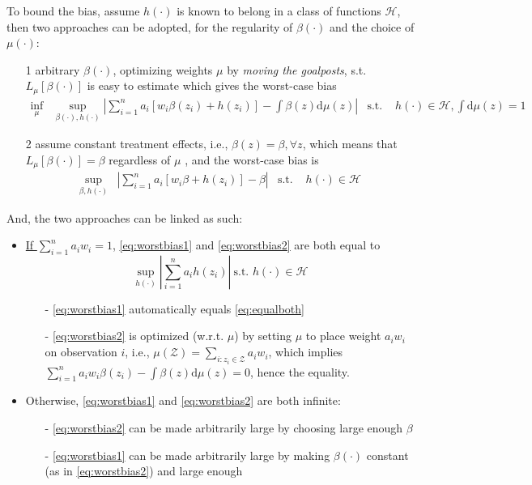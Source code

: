 \documentclass[twoside]{article}
\theoremstyle{definition}
\begin{document}
To bound the bias, assume $h(\cdot)$ is known to belong in a class of functions $\mathcal{H}$, then two approaches can be adopted, for the regularity of $\beta(\cdot)$ and the choice of $\mu(\cdot)$:
\begin{itemize}
  \item[1] arbitrary $\beta(\cdot)$, optimizing weights $\mu$ by \textit{moving the goalposts}, s.t. $L_{\mu}\left[\beta(\cdot)\right]$ is easy to estimate \citep{crump2006moving,imbens2019optimized}
  which gives the worst-case bias
  \begin{align}\label{eq:worstbias1}
    \inf_{\mu} &\sup_{\beta(\cdot),h(\cdot)}\left\vert \sum^n_{i=1}a_i\left[w_i\beta(z_i)+h(z_i)\right] - \int\beta(z)\mathrm{d}\mu(z) \right\vert &\text{s.t. } & h(\cdot)\in\mathcal{H},\int \mathrm{d}\mu(z)=1
  \end{align}
  \item[2] assume constant treatment effects, i.e., $\beta(z)=\beta,\forall z$, which means that $L_{\mu}\left[\beta(\cdot)\right]=\beta$ regardless of $\mu$ \citep{armstrong2020bias}, and the worst-case bias is 
  \begin{align}\label{eq:worstbias2}
    \sup_{\beta,h(\cdot)}&\left\vert \sum^n_{i=1}a_i\left[w_i\beta + h(z_i)\right] -\beta \right\vert & \text{s.t. } & h(\cdot)\in\mathcal{H}
  \end{align}
\end{itemize}

And, the two approaches can be linked as such:
\begin{itemize}
  \item \underline{If $\sum^n_{i=1}a_iw_i=1$}, \ref{eq:worstbias1} and \ref{eq:worstbias2} are both equal to
  \begin{equation}\label{eq:equalboth}
    \sup_{h(\cdot)}\left\vert \sum^n_{i=1}a_ih(z_i) \right\vert\ \text{s.t. } h(\cdot)\in\mathcal{H}
  \end{equation}
  \begin{itemize}
    \item[-] \ref{eq:worstbias1} automatically equals \ref{eq:equalboth}
    \item[-] \ref{eq:worstbias2} is optimized (w.r.t. $\mu$) by setting $\mu$ to place weight $a_iw_i$ on observation $i$, i.e., $\mu(\mathcal{Z})=\sum_{i:z_i\in\mathcal{Z}}a_iw_i$, which implies $\sum^n_{i=1}a_iw_i\beta(z_i)-\int\beta(z)\mathrm{d}\mu(z)=0$, hence the equality.
  \end{itemize}

  \item Otherwise, \ref{eq:worstbias1} and \ref{eq:worstbias2} are both infinite:
  \begin{itemize}
    \item[-] \ref{eq:worstbias2} can be made arbitrarily large by choosing large enough $\beta$ 
    \item[-] \ref{eq:worstbias1} can be made arbitrarily large by making $\beta(\cdot)$ constant (as in \ref{eq:worstbias2}) and large enough
  \end{itemize}
\end{itemize}
\end{document}
